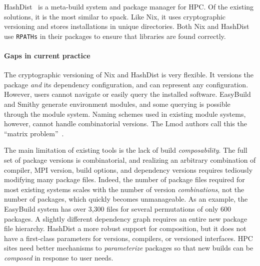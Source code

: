 HashDist~\cite{hashdist} is a meta-build system and package manager
for HPC.  Of the existing solutions, it is the most similar to spack.
Like Nix, it uses cryptographic versioning and stores installations in
unique directories.
%
Both Nix and HashDist use {\tt RPATHs} in their packages to ensure that
libraries are found correctly.

\paragraph{Gaps in current practice}
The cryptographic versioning of Nix and HashDist is very flexible. It versions
the package {\it and} its dependency configuration, and can represent any
configuration. However, users cannot navigate or easily query the installed
software.
%
EasyBuild and Smithy generate environment modules, and some querying is
possible through the module system.  Naming schemes used in existing module
systems, however, cannot handle combinatorial versions. The Lmod authors
call this the ``matrix problem''~\cite{mclay:lmod-tutorial}.



The main limitation of existing tools is the lack of build {\it composability}.
The full set of package versions is combinatorial, and realizing an arbitrary
combination of compiler, MPI version, build options, and dependency versions
requires tediously modifying many package files.
Indeed, the number of package files required for most existing systems scales
with the number of version {\it combinations}, not the number of packages, which
quickly becomes unmanageable.  As an example, the EasyBuild
system has over 3,300 files for several permutations of only 600 packages.
A slightly different dependency graph requires an entire new package file
hierarchy.  HashDist a more robust support for composition,
but it does not have a first-class parameters for versions, compilers,
or versioned interfaces.
%
HPC sites need better mechanisms to {\it parameterize} packages so that new
builds can be {\it composed} in response to user needs.
%
